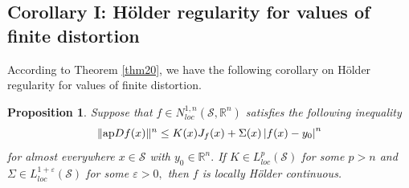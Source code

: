 \documentclass[11pt,twoside]{article}
\newtheorem{prop}[thm]{Proposition}
\theoremstyle{definition}
\theoremstyle{remark}
\newcommand{\abs}[1]{\left|#1\right|}
\begin{document}
\subsection{Corollary I: H\"{o}lder regularity for values of finite distortion}
According to  Theorem \ref{thm20}, we have the following corollary on H\"{o}lder regularity for values of finite distortion.
\begin{prop}\label{dahdujkj}
Suppose that $f\in N_{loc}^{1,n}(\mathcal{S},\mathbb{R}^{n})$  satisfies the following inequality
\begin{equation}
\| {\rm ap}Df(x)\|^{n}\leq K(x)J_{f}(x)+\Sigma(x)\abs{f(x)-y_{0}}^{n}
\end{equation}
for almost everywhere $x\in\mathcal{S}$ with $y_{0}\in\mathbb{R}^{n}.$  If $K\in L_{loc}^{p}(\mathcal{S})$ for some $p>n$ and  $\Sigma\in L_{loc}^{1+\varepsilon}(\mathcal{S})$ for some $\varepsilon>0,$ then $f$ is locally H\"{o}lder continuous.
\end{prop}
\end{document}
